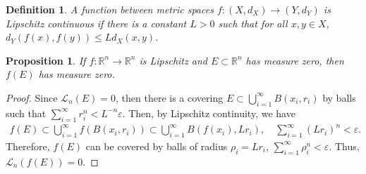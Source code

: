 \documentclass[11pt]{book}
\newtheorem{definition}{Definition}[chapter]
\newtheorem{proposition}{Proposition}[chapter]
\theoremstyle{definition}
\numberwithin{equation}{chapter}
\def\L{{\mathcal L}}
\begin{document}
\medskip

\begin{definition}
A function between metric spaces $f:(X,d_X) \to (Y,d_Y)$ is Lipschitz continuous if there is a constant $L > 0$ such that for all $x, y\in X$, $d_Y(f(x),f(y)) \leq L d_X(x,y)$.
\end{definition}



\medskip

\begin{proposition}\label{proposition_19}
If $f:\mathbb{R}^n \to \mathbb{R}^n$ is Lipschitz and $E \subset \mathbb{R}^n$ has measure zero, then $f(E)$ has measure zero.
\end{proposition}
\begin{proof}
Since $\L_n(E) = 0$, then there is a covering $E \subset \bigcup^\infty_{i=1} B(x_i,r_i)$ by balls such that $\sum^\infty_{i=1} r_i^n < L^{-n} \varepsilon$. Then, by Lipschitz continuity, we have
\begin{align*}
    f(E) \subset \bigcup^\infty_{i=1} f(B(x_i,r_i)) \subset \bigcup^\infty_{i=1} B(f(x_i),Lr_i), \quad \sum^\infty_{i=1} (Lr_i)^n < \varepsilon.
\end{align*}
Therefore, $f(E)$ can be covered by balls of radius $\rho_i = Lr_i$, $\sum^\infty_{i=1} \rho_i^n < \varepsilon$. Thus, $\L_n(f(E)) = 0$.
\end{proof}

\medskip
\end{document}
